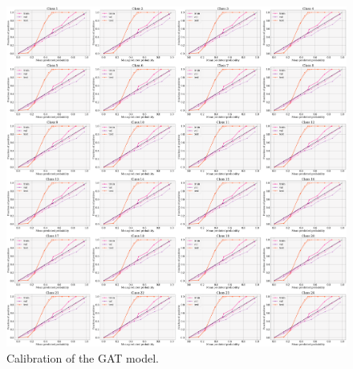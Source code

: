\documentclass[switch, 11pt]{article}
\begin{document}
\begin{figure}[H]
    \centering
    \includegraphics[width=\columnwidth]{figures/calibration.png}
    \caption{Calibration of the GAT model.}
    \label{fig:full_calibration}
\end{figure}
\end{document}
